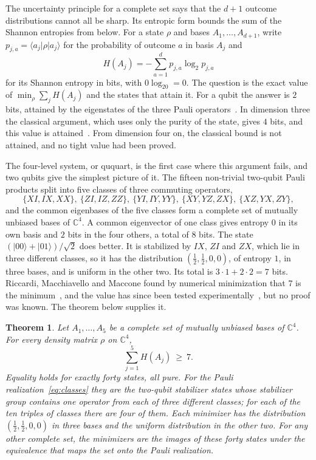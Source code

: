 \documentclass[11pt,a4paper]{article}
\newtheorem{theorem}{Theorem}
\theoremstyle{plain}
\newenvironment{statementframe}{%
  \par\addvspace{0.55\baselineskip}\noindent
  \begingroup\setlength{\fboxrule}{0.3pt}\setlength{\fboxsep}{7pt}%
  \begin{lrbox}{\statementbox}%
  \begin{minipage}{\dimexpr\linewidth-2\fboxsep-2\fboxrule\relax}%
}{%
  \end{minipage}\end{lrbox}%
  {\color{black!45}\fbox{\color{black}\usebox{\statementbox}}}%
  \endgroup\par\addvspace{0.45\baselineskip}%
}
\newcommand{\C}{\mathbb C}
\newcommand{\ket}[1]{\lvert#1\rangle}
\begin{document}
The uncertainty principle for a complete set says that the $d+1$ outcome
distributions cannot all be sharp. Its entropic form bounds the sum of the
Shannon entropies from below. For a state $\rho$ and bases
$A_1,\dots,A_{d+1}$, write $p_{j,a}=\langle a_j|\rho|a_j\rangle$ for the
probability of outcome $a$ in basis $A_j$ and
\begin{equation}
  H(A_j)=-\sum_{a=1}^{d}p_{j,a}\log_2p_{j,a}
\end{equation}
for its Shannon entropy in bits, with $0\log_20=0$. The question is the exact
value of $\min_\rho\sum_jH(A_j)$ and the states that attain it. For a qubit the
answer is $2$ bits, attained by the eigenstates of the three Pauli
operators~\cite{WW2010,CBTW2017}. In dimension three the classical argument,
which uses only the purity of the state, gives $4$ bits, and this value is
attained~\cite{RMM2017}. From dimension four on, the classical bound is not
attained, and no tight value had been proved.

The four-level system, or ququart, is the first case where this argument
fails, and two qubits give the simplest picture of it. The fifteen non-trivial
two-qubit Pauli products split into five classes of three commuting operators,
\begin{equation}\label{eq:classes}
  \{XI,IX,XX\},\ \{ZI,IZ,ZZ\},\ \{YI,IY,YY\},\ \{XY,YZ,ZX\},\ \{XZ,YX,ZY\},
\end{equation}
and the common eigenbases of the five classes form a complete set of mutually
unbiased bases of $\C^4$. A common eigenvector of one class gives entropy $0$
in its own basis and $2$ bits in the four others, a total of $8$ bits. The
state $(\ket{00}+\ket{01})/\sqrt2$ does better. It is stabilized by $IX$, $ZI$
and $ZX$, which lie in three different classes, so it has the distribution
$(\tfrac12,\tfrac12,0,0)$, of entropy $1$, in three bases, and is uniform in the
other two. Its total is $3\cdot1+2\cdot2=7$ bits. Riccardi, Macchiavello and
Maccone found by numerical minimization that $7$ is the minimum~\cite{RMM2017},
and the value has since been tested experimentally~\cite{Serino2025}, but no
proof was known. The theorem below supplies it.

\begin{statementframe}
\begin{theorem}\label{thm:main}
Let $A_1,\dots,A_5$ be a complete set of mutually unbiased bases of $\C^4$.
For every density matrix $\rho$ on $\C^4$,
\begin{equation}\label{eq:main}
  \sum_{j=1}^{5}H(A_j)\ \ge\ 7 .
\end{equation}
Equality holds for exactly forty states, all pure. For the Pauli
realization~\eqref{eq:classes} they are the two-qubit stabilizer states whose
stabilizer group contains one operator from each of three different classes;
for each of the ten triples of classes there are four of them. Each minimizer
has the distribution $(\tfrac12,\tfrac12,0,0)$ in three bases and the uniform
distribution in the other two. For any other complete set, the minimizers are
the images of these forty states under the equivalence that maps the set onto
the Pauli realization.
\end{theorem}
\end{statementframe}
\end{document}
